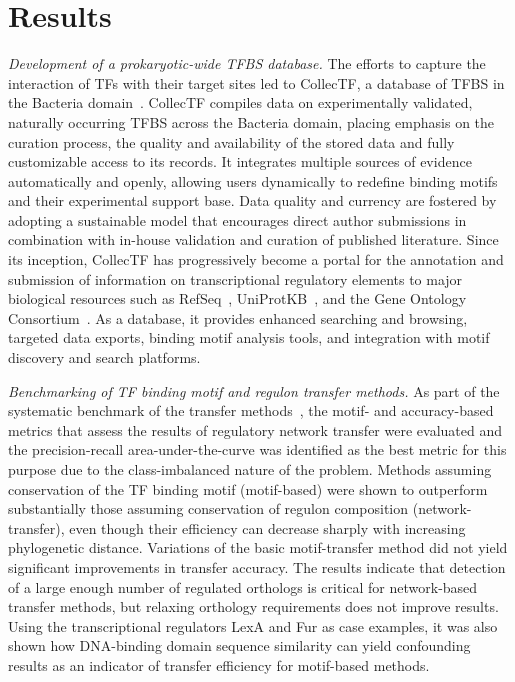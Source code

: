 \section{Results}

\textit{Development of a prokaryotic-wide TFBS database.}  The efforts to
capture the interaction of TFs with their target sites led to CollecTF, a
database of TFBS in the Bacteria domain~\citep{kilic2013collectf,
  kilicc2016data}. CollecTF compiles data on experimentally validated,
naturally occurring TFBS across the Bacteria domain, placing emphasis on
the curation process, the quality and availability of the stored data and fully
customizable access to its records. It integrates multiple sources of evidence
automatically and openly, allowing users dynamically to redefine binding motifs
and their experimental support base. Data quality and currency are fostered by
adopting a sustainable model that encourages direct author submissions in
combination with in-house validation and curation of published
literature. Since its inception, CollecTF has progressively become a portal for
the annotation and submission of information on transcriptional regulatory
elements to major biological resources such as RefSeq~\citep{o2015reference},
UniProtKB~\citep{uniprot2014uniprot}, and the Gene Ontology
Consortium~\citep{gene2013gene}. As a database, it provides enhanced searching and
browsing, targeted data exports, binding motif analysis tools, and integration
with motif discovery and search platforms.

\textit{Benchmarking of TF binding motif and regulon transfer methods.}  As
part of the systematic benchmark of the transfer
methods~\citep{kilic2015assessment}, the motif- and accuracy-based metrics that
assess the results of regulatory network transfer were evaluated and the
precision-recall area-under-the-curve was identified as the best metric for
this purpose due to the class-imbalanced nature of the problem. Methods
assuming conservation of the TF binding motif (motif-based) were shown to
outperform substantially those assuming conservation of regulon composition
(network-transfer), even though their efficiency can decrease sharply with
increasing phylogenetic distance. Variations of the basic motif-transfer method
did not yield significant improvements in transfer accuracy. The results
indicate that detection of a large enough number of regulated orthologs is
critical for network-based transfer methods, but relaxing orthology
requirements does not improve results. Using the transcriptional regulators
LexA and Fur as case examples, it was also shown how DNA-binding domain
sequence similarity can yield confounding results as an indicator of transfer
efficiency for motif-based methods.

